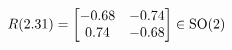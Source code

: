 \documentclass[preview]{standalone}
\begin{document}
\begin{align*}
\special{dvisvgm:raw <g id='unique000'>}R(2.31) = \begin{bmatrix} -0.68 & -0.74 \\ 0.74 & -0.68 \end{bmatrix} \in \text{SO}(2)\special{dvisvgm:raw </g>}
\end{align*}
\end{document}
